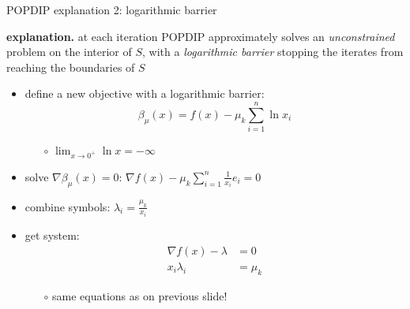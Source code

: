\documentclass[10pt,hyperref,dvipsnames]{beamer}
\newcommand{\grad}{\nabla}
\newcommand{\ds}{\displaystyle}
\begin{document}
\begin{frame}{POPDIP explanation 2: logarithmic barrier}

\textbf{explanation.}  at each iteration POPDIP approximately solves an \emph{unconstrained} problem on the interior of $S$, with a \emph{logarithmic barrier} stopping the iterates from reaching the boundaries of $S$

\bigskip
\begin{itemize}
\item define a new objective with a logarithmic barrier:
\begin{equation*}
\beta_\mu(x) = f(x) - \mu_k \sum_{i=1}^n \ln x_i
\end{equation*}

\vspace{-1mm}
    \begin{itemize}
    \item[$\circ$] $\ds \lim_{x\to 0^+} \ln x = -\infty$
    \end{itemize}
\item solve $\grad \beta_\mu(x)=0$: \quad $\ds \grad f(x) - \mu_k \sum_{i=1}^n \frac{1}{x_i} e_i = 0$
\item combine symbols: $\ds \lambda_i = \frac{\mu_k}{x_i}$
\item get system:
\begin{align*}
\grad f(x) - \lambda &= 0 \\
       x_i \lambda_i &= \mu_k
\end{align*}

\vspace{-3mm}
    \begin{itemize}
    \item[$\circ$] same equations as on previous slide!
    \end{itemize}
\end{itemize}
\end{frame}
\end{document}
